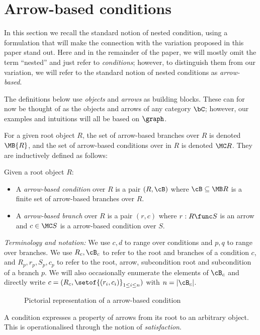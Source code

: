 \section{Arrow-based conditions}
 
In this section we recall the standard notion of nested condition, using a formulation that will make the connection with the variation proposed in this paper stand out. Here and in the remainder of the paper, we will mostly omit the term ``nested'' and just refer to \emph{conditions}; however, to distinguish them from our variation, we will refer to the standard notion of nested conditions as \emph{arrow-based}.

The definitions below use \emph{objects} and \emph{arrows} as building blocks. These can for now be thought of as the objects and arrows of any category $\bC$; however, our examples and intuitions will all be based on $\graph$.

For a given root object $R$, the set of arrow-based branches over $R$ is denoted $\MB{R}$, and the set of arrow-based conditions over in $R$ is denoted $\MC R$. They are inductively defined as follows:

\begin{definition}
  Given a root object $R$:
  \begin{itemize}
  \item A \emph{arrow-based condition} over $R$ is a pair $(R,\cB)$ where $\cB\subseteq \MB R$ is a finite set of arrow-based branches over $R$.
  \item A \emph{arrow-based branch} over $R$ is a pair $(r,c)$ where $r: R\func S$ is an arrow and $c\in \MC S$ is a arrow-based condition over $S$.
  \end{itemize}
\end{definition}
%
\emph{Terminology and notation:} We use $c,d$ to range over conditions and $p,q$ to range over branches. We use $R_c,\cB_c$ to refer to the root and branches of a condition $c$, and $R_p,r_p,S_p,c_p$ to refer to the root, arrow, subcondition root and subcondition of a branch $p$. We will also occasionally enumerate the elements of $\cB_c$ and directly write $c=(R_c, \setof{(r_i, c_i)}_{1\leq i\leq n})$ with $n=|\cB_c|$.
%
\begin{figure}
  \centering
  
  \caption{Pictorial representation of a arrow-based condition}
\end{figure}

\medskip\noindent A condition expresses a property of arrows from its root to an arbitrary object. This is operationalised through the notion of \emph{satisfaction}.


